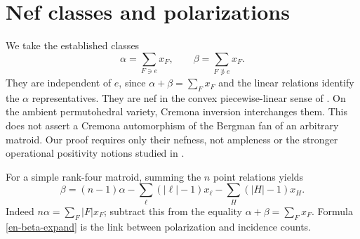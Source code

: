 \documentclass[12pt]{amsart}
\theoremstyle{definition}
\theoremstyle{remark}
\numberwithin{equation}{section}
\begin{document}
\section{Nef classes and polarizations}
We take the established classes
\begin{equation}\label{en-ab}
 \alpha=\sum_{F\ni e}x_F,\qquad \beta=\sum_{F\not\ni e}x_F.
\end{equation}
They are independent of $e$, since $\alpha+\beta=\sum_Fx_F$ and the linear relations identify the $\alpha$ representatives. They are nef in the convex piecewise-linear sense of \cite[Definition 5.7 and Lemma 9.7]{AHK}. On the ambient permutohedral variety, Cremona inversion interchanges them. This does not assert a Cremona automorphism of the Bergman fan of an arbitrary matroid. Our proof requires only their nefness, not ampleness or the stronger operational positivity notions studied in \cite{Che}.

For a simple rank-four matroid, summing the $n$ point relations yields
\begin{equation}\label{en-beta-expand}
 \beta=(n-1)\alpha-\sum_\ell(|\ell|-1)x_\ell
                       -\sum_H(|H|-1)x_H.
\end{equation}
Indeed $n\alpha=\sum_F|F|x_F$; subtract this from the equality $\alpha+\beta=\sum_Fx_F$. Formula \eqref{en-beta-expand} is the link between polarization and incidence counts.
\end{document}

